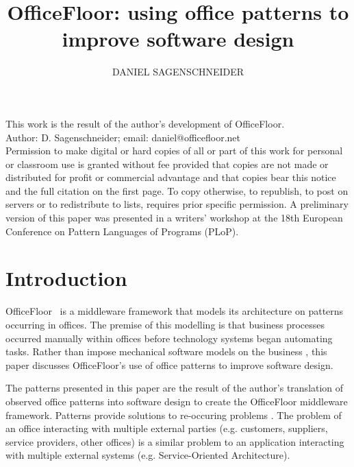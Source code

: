 \documentclass[prodmode]{style/acmlarge}
\title{OfficeFloor: using office patterns to improve software design}
\author{DANIEL SAGENSCHNEIDER \affil{OfficeFloor, daniel@officefloor.net}}
\begin{document}
\graphicspath{{./pdf/}}

\lstset{language=Java}

\captionsetup[lstlisting]{font=footnotesize}


\begin{bottomstuff}
This work is the result of the author's development of OfficeFloor.\\
Author: D. Sagenschneider; email: daniel@officefloor.net\\

Permission to make digital or hard copies of all or part of this work for
personal or classroom use is granted without fee provided that copies are not
made or distributed for profit or commercial advantage and that copies bear this
notice and the full citation on the first page. To copy otherwise, to republish,
to post on servers or to redistribute to lists, requires prior specific
permission. A preliminary version of this paper was presented in a writers'
workshop at the 18th European Conference on Pattern Languages of Programs
(PLoP).
\end{bottomstuff}

\maketitle




\section{Introduction}

OfficeFloor~\cite{officefloor} is a middleware framework that models its
architecture on patterns occurring in offices.  The premise of this modelling is
that business processes occurred manually within offices before technology
systems began automating tasks.  Rather than impose mechanical software models
on the business
\cite{enterprise-process-modelling,model-business-process,model-sociotechnical},
this paper discusses OfficeFloor's use of office patterns to improve software
design.

The patterns presented in this paper are the result of the author's translation
of observed office patterns into software design to create the OfficeFloor
middleware framework.  Patterns provide solutions to re-occuring problems
\cite{pattern-language}.  The problem of an office interacting with multiple
external parties (e.g. customers, suppliers, service providers, other offices)
is a similar problem to an application interacting with multiple external
systems (e.g. Service-Oriented Architecture).
\end{document}
